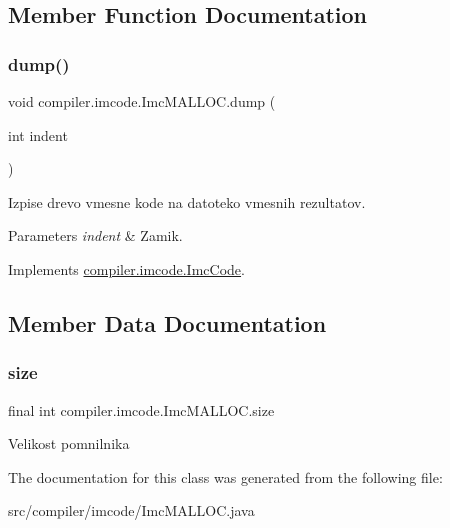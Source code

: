\subsection{Member Function Documentation}
\mbox{\label{classcompiler_1_1imcode_1_1_imc_m_a_l_l_o_c_a6785f2c557644c1c09d834226ed22c1d}} 
\subsubsection{\texorpdfstring{dump()}{dump()}}
{\footnotesize\ttfamily void compiler.\+imcode.\+Imc\+M\+A\+L\+L\+O\+C.\+dump (\begin{DoxyParamCaption}\item[{int}]{indent }\end{DoxyParamCaption})}

Izpise drevo vmesne kode na datoteko vmesnih rezultatov.


\begin{DoxyParams}{Parameters}
{\em indent} & Zamik. \\
\hline
\end{DoxyParams}


Implements \hyperlink{interfacecompiler_1_1imcode_1_1_imc_code_a26451dea2ab4dbd7054ac33f4c6d71fe}{compiler.\+imcode.\+Imc\+Code}.



\subsection{Member Data Documentation}
\mbox{\label{classcompiler_1_1imcode_1_1_imc_m_a_l_l_o_c_aa598168e8a1d53b2899c55712f4202dd}} 
\subsubsection{\texorpdfstring{size}{size}}
{\footnotesize\ttfamily final int compiler.\+imcode.\+Imc\+M\+A\+L\+L\+O\+C.\+size}

Velikost pomnilnika 

The documentation for this class was generated from the following file\+:\begin{DoxyCompactItemize}
\item 
src/compiler/imcode/Imc\+M\+A\+L\+L\+O\+C.\+java\end{DoxyCompactItemize}
